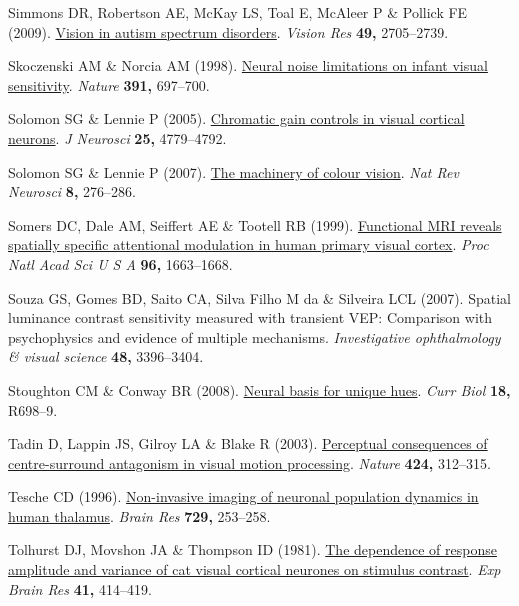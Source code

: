 \documentclass[
  letterpaper,
  DIV=11,
  numbers=noendperiod]{scrartcl}
\newlength{\cslhangindent}
\newenvironment{CSLReferences}[2] %
 {\begin{list}{}{%
  \setlength{\itemindent}{0pt}
  \setlength{\leftmargin}{0pt}
  \setlength{\parsep}{0pt}
  \ifodd #1
   \setlength{\leftmargin}{\cslhangindent}
   \setlength{\itemindent}{-1\cslhangindent}
  \fi
  \setlength{\itemsep}{#2\baselineskip}}}
 {\end{list}}
\begin{document}
\begin{CSLReferences}{1}{1}
Simmons DR, Robertson AE, McKay LS, Toal E, McAleer P \& Pollick FE
(2009). \href{https://doi.org/10.1016/j.visres.2009.08.005}{Vision in
autism spectrum disorders}. \emph{Vision Res} \textbf{49,} 2705--2739.

Skoczenski AM \& Norcia AM (1998).
\href{https://doi.org/10.1038/35630}{Neural noise limitations on infant
visual sensitivity}. \emph{Nature} \textbf{391,} 697--700.

Solomon SG \& Lennie P (2005).
\href{https://doi.org/10.1523/JNEUROSCI.5316-04.2005}{Chromatic gain
controls in visual cortical neurons}. \emph{J Neurosci} \textbf{25,}
4779--4792.

Solomon SG \& Lennie P (2007).
\href{https://doi.org/10.1038/nrn2094}{The machinery of colour vision}.
\emph{Nat Rev Neurosci} \textbf{8,} 276--286.

Somers DC, Dale AM, Seiffert AE \& Tootell RB (1999).
\href{https://doi.org/10.1073/pnas.96.4.1663}{Functional MRI reveals
spatially specific attentional modulation in human primary visual
cortex}. \emph{Proc Natl Acad Sci U S A} \textbf{96,} 1663--1668.

Souza GS, Gomes BD, Saito CA, Silva Filho M da \& Silveira LCL (2007).
Spatial luminance contrast sensitivity measured with transient {VEP}:
Comparison with psychophysics and evidence of multiple mechanisms.
\emph{Investigative ophthalmology \& visual science} \textbf{48,}
3396--3404.

Stoughton CM \& Conway BR (2008).
\href{https://doi.org/10.1016/j.cub.2008.06.018}{Neural basis for unique
hues}. \emph{Curr Biol} \textbf{18,} R698--9.

Tadin D, Lappin JS, Gilroy LA \& Blake R (2003).
\href{https://doi.org/10.1038/nature01800}{Perceptual consequences of
centre-surround antagonism in visual motion processing}. \emph{Nature}
\textbf{424,} 312--315.

Tesche CD (1996).
\href{https://www.ncbi.nlm.nih.gov/pubmed/8876995}{Non-invasive imaging
of neuronal population dynamics in human thalamus}. \emph{Brain Res}
\textbf{729,} 253--258.

Tolhurst DJ, Movshon JA \& Thompson ID (1981).
\href{https://doi.org/10.1007/BF00238900}{The dependence of response
amplitude and variance of cat visual cortical neurones on stimulus
contrast}. \emph{Exp Brain Res} \textbf{41,} 414--419.


\end{CSLReferences}
\end{document}
